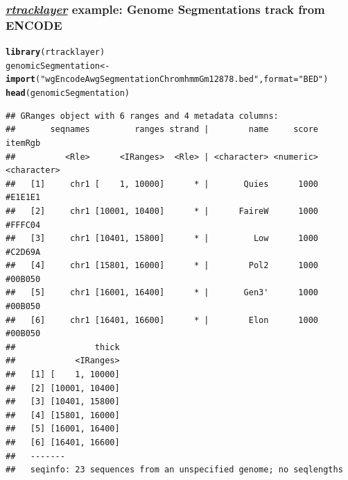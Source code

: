 \documentclass{beamer}\usepackage[]{graphicx}\usepackage[]{color}
\makeatletter
\newcommand{\hlstr}[1]{\textcolor[rgb]{0.192,0.494,0.8}{#1}}%
\newcommand{\hlstd}[1]{\textcolor[rgb]{0.345,0.345,0.345}{#1}}%
\newcommand{\hlkwb}[1]{\textcolor[rgb]{0.69,0.353,0.396}{#1}}%
\newcommand{\hlkwc}[1]{\textcolor[rgb]{0.333,0.667,0.333}{#1}}%
\newcommand{\hlkwd}[1]{\textcolor[rgb]{0.737,0.353,0.396}{\textbf{#1}}}%
\newenvironment{kframe}{%
 \def\at@end@of@kframe{}%
 \ifinner\ifhmode%
  \def\at@end@of@kframe{\end{minipage}}%
  \begin{minipage}{\columnwidth}%
 \fi\fi%
 \def\FrameCommand##1{\hskip\@totalleftmargin \hskip-\fboxsep
 \colorbox{shadecolor}{##1}\hskip-\fboxsep
     \hskip-\linewidth \hskip-\@totalleftmargin \hskip\columnwidth}%
 \MakeFramed {\advance\hsize-\width
   \@totalleftmargin\z@ \linewidth\hsize
   \@setminipage}}%
 {\par\unskip\endMakeFramed%
 \at@end@of@kframe}
\newenvironment{knitrout}{}{} %
\newcommand{\Rpackage}[1]{{\usebeamercolor[fg]{structure} \textsl{#1}}}
\newcommand\Biocpkg[1]{%
  {\href{http://bioconductor.org/packages/release/bioc/html/#1.html}%
    {\Rpackage{#1}}}}
\makeatother
\begin{document}
\begin{frame}[fragile]
  \frametitle{\Biocpkg{rtracklayer} example: Genome Segmentations track from ENCODE}
\begin{knitrout}\tiny
{}\color{fgcolor}\begin{kframe}
\begin{alltt}
\hlkwd{library}\hlstd{(rtracklayer)}
\hlstd{genomicSegmentation} \hlkwb{<-} \hlkwd{import}\hlstd{(}\hlstr{"wgEncodeAwgSegmentationChromhmmGm12878.bed"}\hlstd{,} \hlkwc{format}\hlstd{=}\hlstr{"BED"}\hlstd{)}
\hlkwd{head}\hlstd{(genomicSegmentation)}
\end{alltt}
\begin{verbatim}
## GRanges object with 6 ranges and 4 metadata columns:
##       seqnames         ranges strand |        name     score     itemRgb
##          <Rle>      <IRanges>  <Rle> | <character> <numeric> <character>
##   [1]     chr1 [    1, 10000]      * |       Quies      1000     #E1E1E1
##   [2]     chr1 [10001, 10400]      * |      FaireW      1000     #FFFC04
##   [3]     chr1 [10401, 15800]      * |         Low      1000     #C2D69A
##   [4]     chr1 [15801, 16000]      * |        Pol2      1000     #00B050
##   [5]     chr1 [16001, 16400]      * |       Gen3'      1000     #00B050
##   [6]     chr1 [16401, 16600]      * |        Elon      1000     #00B050
##                thick
##            <IRanges>
##   [1] [    1, 10000]
##   [2] [10001, 10400]
##   [3] [10401, 15800]
##   [4] [15801, 16000]
##   [5] [16001, 16400]
##   [6] [16401, 16600]
##   -------
##   seqinfo: 23 sequences from an unspecified genome; no seqlengths
\end{verbatim}
\end{kframe}
\end{knitrout}
\end{frame}
\end{document}
